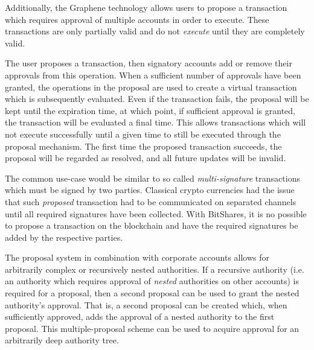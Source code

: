 Additionally, the Graphene technology allows users to propose a transaction
which requires approval of multiple accounts in order to execute.
These transactions are only partially valid and do not \emph{execute} until
they are completely valid.

The user proposes a transaction, then signatory accounts add or remove their
approvals from this operation. When a sufficient number of approvals have been
granted, the operations in the proposal are used to create a virtual
transaction which is subsequently evaluated. Even if the transaction fails, the
proposal will be kept until the expiration time, at which point, if sufficient
approval is granted, the transaction will be evaluated a final time. This
allows transactions which will not execute successfully until a given time to
still be executed through the proposal mechanism. The first time the proposed
transaction succeeds, the proposal will be regarded as resolved, and all future
updates will be invalid.

The common use-case would be similar to so called \emph{multi-signature}
transactions which must be signed by two parties. Classical crypto currencies
had the issue that such \emph{proposed} transaction had to be communicated on
separated channels until all required signatures have been collected.
With BitShares, it is no possible to propose a transaction on the blockchain
and have the required signatures be added by the respective parties.

The proposal system in combination with corporate accounts allows for
arbitrarily complex or recursively nested authorities. If a recursive authority
(i.e. an authority which requires approval of \emph{nested} authorities on other
accounts) is required for a proposal, then a second proposal can be used to
grant the nested authority's approval. That is, a second proposal can be
created which, when sufficiently approved, adds the approval of a nested
authority to the first proposal. This multiple-proposal scheme can be used to
acquire approval for an arbitrarily deep authority tree.

